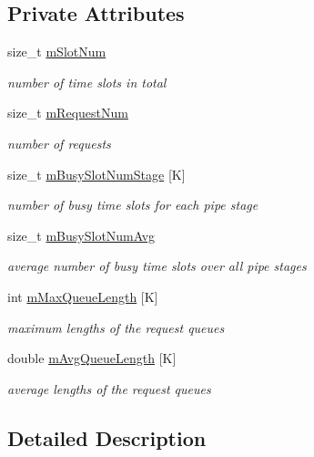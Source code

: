 \subsection*{Private Attributes}
\begin{DoxyCompactItemize}
\item 
size\-\_\-t \hyperlink{classCirSched_abfff83dd8fcbea59762014b06620ac69}{m\-Slot\-Num}
\begin{DoxyCompactList}\small\item\em number of time slots in total \end{DoxyCompactList}\item 
size\-\_\-t \hyperlink{classCirSched_acd7ba9fa2e160b2fea6e5600820f93f6}{m\-Request\-Num}
\begin{DoxyCompactList}\small\item\em number of requests \end{DoxyCompactList}\item 
size\-\_\-t \hyperlink{classCirSched_a455f89c9ba1df90426062f1d7be3f768}{m\-Busy\-Slot\-Num\-Stage} \mbox{[}K\mbox{]}
\begin{DoxyCompactList}\small\item\em number of busy time slots for each pipe stage \end{DoxyCompactList}\item 
size\-\_\-t \hyperlink{classCirSched_ac26481f524f6f1e0c01f077fd11fedb7}{m\-Busy\-Slot\-Num\-Avg}
\begin{DoxyCompactList}\small\item\em average number of busy time slots over all pipe stages \end{DoxyCompactList}\item 
int \hyperlink{classCirSched_aef4a2f15ecdea422b3b3c2e271f2a41d}{m\-Max\-Queue\-Length} \mbox{[}K\mbox{]}
\begin{DoxyCompactList}\small\item\em maximum lengths of the request queues \end{DoxyCompactList}\item 
double \hyperlink{classCirSched_abeeef452afbbfd2449cb7665d4e1a692}{m\-Avg\-Queue\-Length} \mbox{[}K\mbox{]}
\begin{DoxyCompactList}\small\item\em average lengths of the request queues \end{DoxyCompactList}\end{DoxyCompactItemize}


\subsection{Detailed Description}
